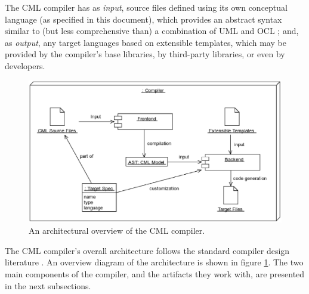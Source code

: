 The CML compiler has as \emph{input},
source files defined using its own conceptual language (as specified in this document),
which provides an abstract syntax similar to (but less comprehensive than) a combination of UML \cite{uml} and OCL \cite{ocl};
and, as \emph{output}, any target languages based on extensible templates,
which may be provided by the compiler's base libraries, by third-party libraries, or even by developers.

\begin{figure}
\centering
\includegraphics[width=\textwidth]{compiler/figure-overview}
\caption{An architectural overview of the CML compiler.}
\label{fig:overview}
\end{figure}

The CML compiler's overall architecture follows the standard compiler design literature \cite{torben}. An overview diagram of the architecture is shown in figure \ref{fig:overview}.
The two main components of the compiler,
and the artifacts they work with,
are presented in the next subsections.
